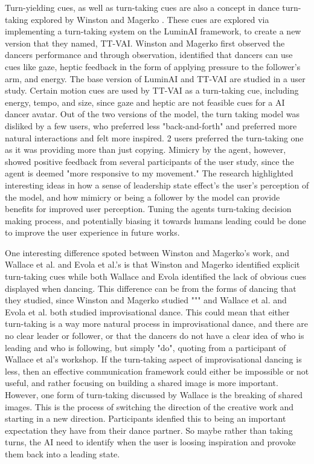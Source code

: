 \documentclass[final,5p,times,twocolumn,authoryear]{article}
\begin{document}
Turn-yielding cues, as well as turn-taking cues are also a concept in
dance turn-taking explored by Winston and Magerko
\cite{Winston2017}. These cues are explored via implementing a
turn-taking system on the LuminAI framework, to create a new version
that they named, TT-VAI. Winston and Magerko first observed the dancers
performance and through observation, identified that dancers can use
cues like gaze, heptic feedback in the form of applying pressure to the
follower's arm, and energy. The base version of LuminAI and TT-VAI are
studied in a user study. Certain motion cues are used by TT-VAI as a
turn-taking cue, including energy, tempo, and size, since gaze and
heptic are not feasible cues for a AI dancer avatar. Out of the two versions of the
model, the turn taking model was disliked by a few users, who preferred
less "back-and-forth" and preferred more natural interactions and felt
more inspired. 2 users preferred the turn-taking one as it was providing
more than just copying. Mimicry by the agent, however, showed positive
feedback from several participants of the user study, since the agent is
deemed "more responsive to my movement." The research highlighted
interesting ideas in how a sense of leadership state effect's the user's
perception of the model, and how mimicry or being a follower by the
model can provide benefits for improved user perception. Tuning the
agents turn-taking decision making process, and potentially biasing it
towards humans leading could be done to improve the user experience in
future works.

One interesting difference spoted between Winston and Magerko's work, and
Wallace et al. and Evola et al.'s is that Winston and Magerko identified explicit
turn-taking cues while both Wallace and Evola identified the lack of
obvious cues displayed when dancing. This difference can be from the
forms of dancing that they studied, since Winston and Magerko studied
""" and Wallace et al. and Evola et al. both studied improvisational
dance. This could mean that either turn-taking is a way more natural
process in improvisational dance, and there are no clear leader or
follower, or that the dancers do not have a clear idea of who is leading
and who is following, but simply "do", quoting from a participant of
Wallace et al's workshop. If the turn-taking aspect of improvisational
dancing is less, then an effective communication framework could either
be impossible or not useful, and rather focusing on building a shared
image is more important. However, one form of turn-taking discussed
by Wallace is the breaking of shared images. This is the process of
switching the direction of the creative work and starting in a new
direction. Participants idenfied this to being an important expectation
they have from their dance partner. So maybe rather than taking turns,
the AI need to identify when the user is loosing inspiration and provoke
them back into a leading state.
\end{document}
